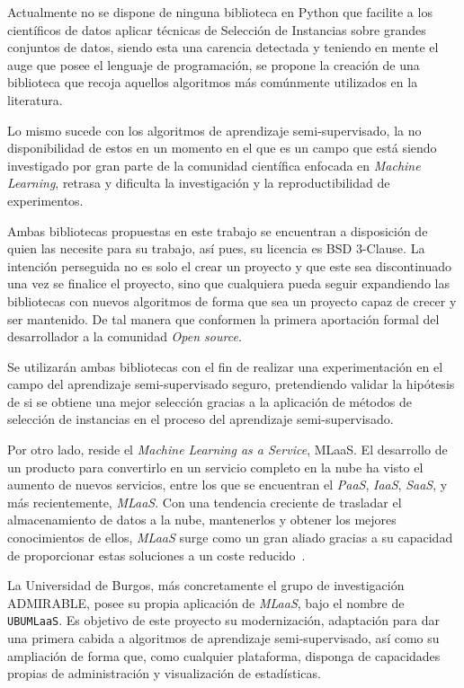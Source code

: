 
Actualmente no se dispone de ninguna biblioteca en Python que facilite a los científicos de datos aplicar técnicas de Selección de Instancias sobre grandes conjuntos de datos, siendo esta una carencia detectada y teniendo en mente el auge que posee el lenguaje de programación, se propone la creación de una biblioteca que recoja aquellos algoritmos más comúnmente utilizados en la literatura. 

Lo mismo sucede con los algoritmos de aprendizaje semi-supervisado, la no disponibilidad de estos en un momento en el que es un campo que está siendo investigado por gran parte de la comunidad científica enfocada en \textit{Machine Learning}, retrasa y dificulta la investigación y la reproductibilidad de experimentos.

Ambas bibliotecas propuestas en este trabajo se encuentran a disposición de quien las necesite para su trabajo, así pues, su licencia es BSD 3-Clause. La intención perseguida no es solo el crear un proyecto y que este sea discontinuado una vez se finalice el proyecto, sino que cualquiera pueda seguir expandiendo las bibliotecas con nuevos algoritmos de forma que sea un proyecto capaz de crecer y ser mantenido. De tal manera que conformen la primera aportación formal del desarrollador a la comunidad \textit{Open source}.

Se utilizarán ambas bibliotecas con el fin de realizar una experimentación en el campo del aprendizaje semi-supervisado seguro, pretendiendo validar la hipótesis de si se obtiene una mejor selección gracias a la aplicación de métodos de selección de instancias en el proceso del aprendizaje semi-supervisado. 

Por otro lado, reside el \textit{Machine Learning as a Service}, MLaaS. El desarrollo de un producto para convertirlo en un servicio completo en la nube ha visto el aumento de nuevos servicios, entre los que se encuentran el \textit{PaaS}, \textit{IaaS}, \textit{SaaS}, y más recientemente, \textit{MLaaS}. Con una tendencia creciente de trasladar el almacenamiento de datos a la nube, mantenerlos y obtener los mejores conocimientos de ellos, \textit{MLaaS} surge como un gran aliado gracias a su capacidad de proporcionar estas soluciones a un coste reducido~\cite{whatismlaas}.

La Universidad de Burgos, más concretamente el grupo de investigación ADMIRABLE, posee su propia aplicación de \textit{MLaaS}, bajo el nombre de \texttt{UBUMLaaS}. Es objetivo de este proyecto su modernización, adaptación para dar una primera cabida a algoritmos de aprendizaje semi-supervisado, así como su ampliación de forma que, como cualquier plataforma, disponga de capacidades propias de administración y visualización de estadísticas.

